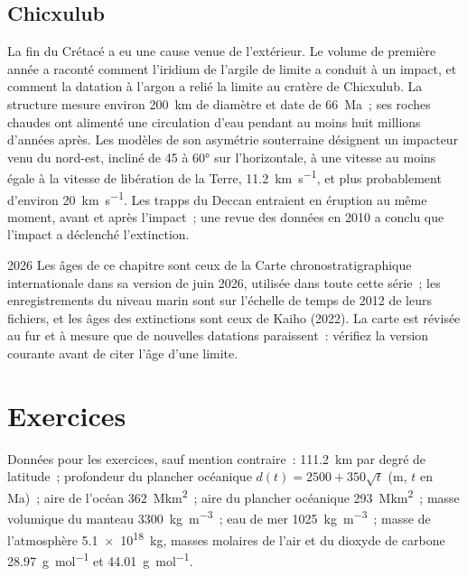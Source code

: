\subsection*{Chicxulub}

La fin du Crétacé a eu une cause venue de l'extérieur. Le volume de première année a raconté comment l'iridium
de l'argile de limite a conduit à un impact, et comment la datation à l'argon a relié la limite au
cratère de Chicxulub. La structure mesure environ \qty{200}{km} de diamètre et date de \qty{66}{Ma}~; ses
roches chaudes ont alimenté une circulation d'eau pendant au moins huit millions d'années après. Les modèles
de son asymétrie souterraine désignent un impacteur venu du nord-est, incliné de 45 à \ang{60} sur
l'horizontale, à une vitesse au moins égale à la vitesse de libération de la Terre, \qty{11.2}{km.s^{-1}}, et
plus probablement d'environ \qty{20}{km.s^{-1}}. Les trapps du Deccan entraient en éruption au même moment,
avant et après l'impact~; une revue des données en 2010 a conclu que l'impact a déclenché l'extinction.

\begin{dated}{2026}
Les âges de ce chapitre sont ceux de la Carte chronostratigraphique internationale dans sa version de juin
2026, utilisée dans toute cette série~; les enregistrements du niveau marin sont sur l'échelle de temps de 2012
de leurs fichiers, et les âges des extinctions sont ceux de Kaiho (2022). La carte est révisée au fur et à
mesure que de nouvelles datations paraissent~: vérifiez la version courante avant de citer l'âge d'une limite.
\end{dated}

\section*{Exercices}\label{sec:b2:phanerozoic-earth:exercises}

Données pour les exercices, sauf mention contraire~: \qty{111.2}{km} par degré de
latitude~; profondeur du plancher océanique $d(t) = 2500 + 350\sqrt t$ (\unit{m}, $t$
en \unit{Ma})~; aire de l'océan \qty{362}{\mega km^2}~; aire du plancher océanique
\qty{293}{\mega km^2}~; masse volumique du manteau \qty{3300}{kg.m^{-3}}~; eau de mer
\qty{1025}{kg.m^{-3}}~; masse de l'atmosphère \qty{5.1e18}{kg}, masses molaires de
l'air et du dioxyde de carbone \qty{28.97}{g.mol^{-1}} et \qty{44.01}{g.mol^{-1}}.

